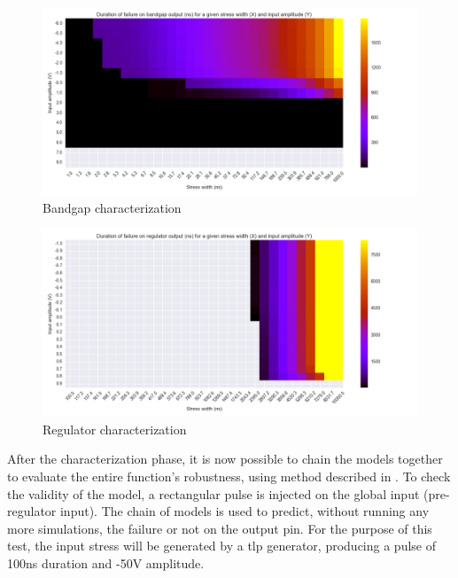 \begin{figure}[!htbp]
  \centering
  \includegraphics[width=\textwidth]{src/4/figures/bandgap_cz.png}
  \caption{Bandgap characterization}
  \label{bandgap_wb}
\end{figure}

\begin{figure}[!htbp]
  \centering
  \includegraphics[width=\textwidth]{src/4/figures/regulator_cz.png}
  \caption{Regulator characterization}
  \label{regu_wb}
\end{figure}


After the characterization phase, it is now possible to chain the models together to evaluate the entire function's robustness, using method described in \label{sec:block-chaining}.
To check the validity of the model, a rectangular pulse is injected on the global input (pre-regulator input).
The chain of models is used to predict, without running any more simulations, the failure or not on the output pin.
For the purpose of this test, the input stress will be generated by a \gls{tlp} generator, producing a pulse of 100ns duration and -50V amplitude.

